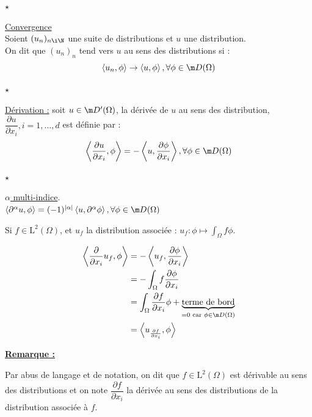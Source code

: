 \documentclass[12pt,a4paper]{article}
\begin{document}
	$\star$ \begin{minipage}[t]{20cm}
				\underline{Convergence}\\
				Soient $(u_n)_{n \i \N}$ une suite de distributions et $u$ une distribution.\\
				On dit que $(u_n)_n$ tend vers $u$ au sens des distributions si :
				\[
				\left<u_n,\phi\right> \to \left<u,\phi\right>, \forall \phi \in \m D(\Omega)
				\]
			\end{minipage}
	\par $\star$ \begin{minipage}[t]{20cm}
					\underline{Dérivation :} soit $u \in \m D'(\Omega)$, la dérivée de $u$ au sens des distribution, $\dfrac{\partial u}{\partial x_i}, i = 1,\ldots,d$ est définie par :
					\[
					\left<\dfrac{\partial u}{\partial x_i},\phi\right> = - \left<u,\dfrac{\partial\phi}{\partial x_i}\right>, \forall \phi \in \m D (\Omega)
					\]
				\end{minipage}
	
	\par $\star$ \begin{minipage}[t]{20cm}		
					\underline{$\alpha$ multi-indice}.\\
					$\left<\partial^\alpha u,\phi\right> = (-1)^{|\alpha|}\left<u,\partial^\alpha\phi\right>, \forall\phi\in \m D(\Omega)$
				\end{minipage}
	
	\begin{ex}
		\begin{minipage}[t]{15cm}
			Si $f \in \text{L}^2(\Omega)$, et $u_f$ la distribution associée : $u_f : \phi \mapsto \int_\Omega f \phi$.
		\end{minipage}
		
			\[\begin{aligned}
			\left<\dfrac{\partial}{\partial x_i} u_f,\phi\right> 
			&= -\left<u_f, \frac{\partial\phi}{\partial x_i}\right>\\ 
			&= - \displaystyle\int_\Omega f\dfrac{\partial\phi}{\partial x_i} \\
			&= \int_\Omega\dfrac{\partial f}{\partial x_i} \phi + \underbrace{\text{terme de bord}}_{= 0 \text{ car } \phi \in \m D(\Omega)} \\
			&= \left<u_{\frac{\partial f}{\partial x_i}},\phi\right>
		\end{aligned}\]
 	\end{ex}
 	
 	\textbf{\underline{Remarque :}} \begin{minipage}[t]{15cm}
								 			Par abus de langage et de notation, on dit que $f \in \text{L}^2(\Omega)$ est dérivable au sens des distributions et on note $\dfrac{\partial f}{\partial x_i}$ la dérivée au sens des distributions de la distribution associée à $f$.
								 	\end{minipage}
								 	
\end{document}
